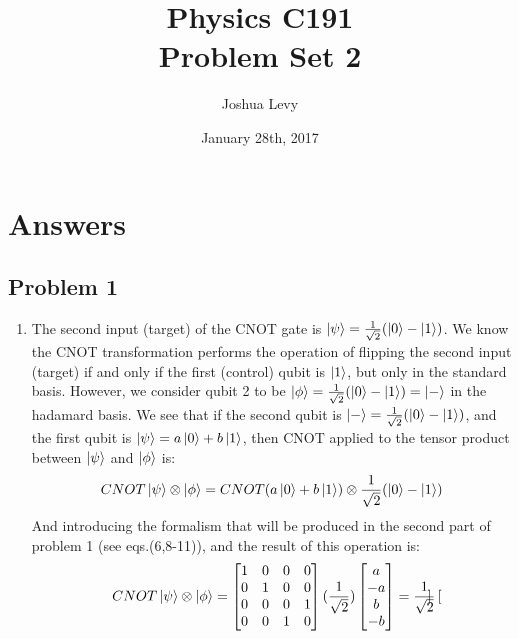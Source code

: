 \documentclass{article}
\title{Physics C191\\Problem Set 2}
\author{Joshua Levy}
\date{January 28th, 2017}
\newcommand{\tens}[1]{%
  \mathbin{\mathop{\otimes}\displaylimits_{#1}}%
}
\begin{document}
\maketitle

\section{Answers}
\subsection{Problem 1}
    \begin{enumerate}
        \item The second input (target) of the CNOT gate is $\ket{\psi} = \frac{1}{\sqrt{2}}(\ket{0}-\ket{1})$. We know the CNOT transformation performs the operation of flipping the second input (target) if and only if the first (control) qubit is $\ket{1}$, but only in the standard basis. However, we consider qubit 2 to be $\ket{\phi} = \frac{1}{\sqrt{2}}(\ket{0}-\ket{1}) = \ket{-}$ in the hadamard basis. We see that if the second qubit is $\ket{-} = \frac{1}{\sqrt{2}}(\ket{0}-\ket{1})$, and the first qubit is $\ket{\psi} = a\ket{0}+b\ket{1}$, then CNOT applied to the tensor product between $\ket{\psi}$ and $\ket{\phi}$ is:
        \begin{equation}
            CNOT \ket{\psi}\tens{}\ket{\phi} = CNOT (a\ket{0}+b\ket{1})\tens{} \frac{1}{\sqrt{2}}(\ket{0}-\ket{1})
        \end{equation}
        And introducing the formalism that will be produced in the second part of problem 1 (see eqs.(6,8-11)), and the result of this operation is:
        \begin{equation}
            CNOT \ket{\psi}\tens{}\ket{\phi} = \begin{bmatrix}
            1 &    0  &   0    & 0\\
            0   & 1    & 0 &    0\\
            0    & 0   & 0   & 1\\
             0   & 0 &    1   &  0\\
            \end{bmatrix}(\frac{1}{\sqrt{2}})\begin{bmatrix}
            a\\-a\\b\\-b
            \end{bmatrix} = \frac{1}{\sqrt{2}}\begin{bmatrix}

\end{bmatrix}
\end{equation}
\end{enumerate}
\end{document}
